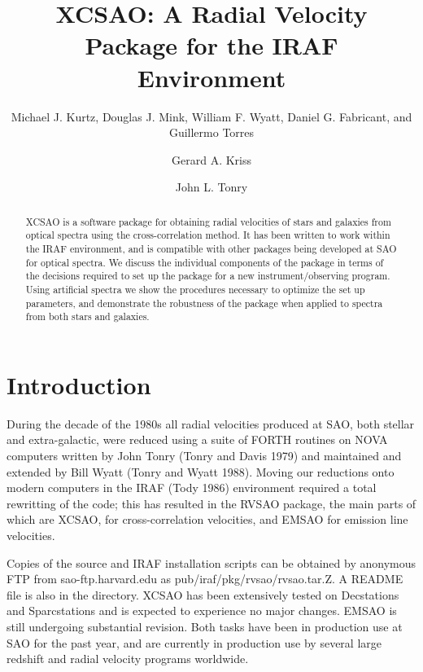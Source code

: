 



\title{XCSAO: A Radial Velocity Package for the IRAF Environment}
\author{Michael J. Kurtz, Douglas J. Mink, William F. Wyatt, Daniel G.
Fabricant, and Guillermo Torres}

\author{Gerard A. Kriss}

\author{John L. Tonry}

\begin{abstract}
XCSAO is a software package for obtaining radial velocities of stars and
galaxies from optical spectra using the cross-correlation method.  It has been 
written to work within the IRAF environment, and is compatible with other
packages being developed at SAO for optical spectra.  We discuss the individual 
components of the package in terms of the decisions required to set up the
package for a new instrument/observing program.  Using artificial spectra we
show the procedures necessary to optimize the set up parameters, and
demonstrate the robustness of the package when applied to spectra from both
stars and galaxies.
\end{abstract}


\section{Introduction}

During the decade of the 1980s all radial velocities produced at SAO, both
stellar and extra-galactic, were reduced using a suite of FORTH routines on 
NOVA computers written by John Tonry (Tonry and Davis 1979) and maintained and
extended by Bill Wyatt (Tonry and Wyatt 1988).  Moving our reductions onto
modern computers in the IRAF (Tody 1986) environment required a total
rewritting of the code; this has resulted in the RVSAO package, the main parts
of which are XCSAO, for cross-correlation velocities, and EMSAO for emission
line velocities.  

Copies of the source and IRAF installation scripts
can be obtained by anonymous FTP from sao-ftp.harvard.edu as
pub/iraf/pkg/rvsao/rvsao.tar.Z.  A README file is also in the directory.
XCSAO has been extensively tested on Decstations and Sparcstations and is
expected to experience no major changes.  EMSAO is still undergoing substantial
revision.  Both tasks have been in production use at SAO for the past year, 
and are currently in production use by several large redshift and radial 
velocity programs worldwide.

